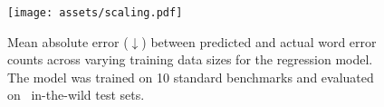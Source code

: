 \begin{figure}
    \centering
    \texttt{[image: assets/scaling.pdf]}
    \caption{Mean absolute error (\(\downarrow\)) between predicted and actual word error counts across varying training data sizes for the regression model. The model was trained on 10 standard benchmarks and evaluated on {\nwilds}~in-the-wild test sets.}

    \label{fig:scaling}
\end{figure}